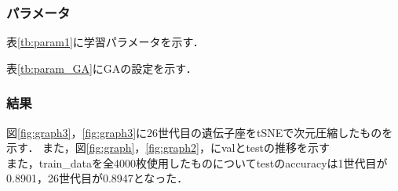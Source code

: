 \documentclass[twocolumn]{jarticle}     %
\begin{document}
\subsubsection{パラメータ}
表\ref{tb:param1}に学習パラメータを示す．
\begin{table}[h]
	\centering
	\caption{学習パラメータ\label{tb:param1}}
\end{table}
表\ref{tb:param_GA}にGAの設定を示す．
\begin{table}[h]
	\centering
	\caption{実験パラメータ\label{tb:param_GA}}
\end{table}
\subsubsection{結果}
図\ref{fig:graph3}，\ref{fig:graph3}に26世代目の遺伝子座をtSNEで次元圧縮したものを示す．
また，図\ref{fig:graph}，\ref{fig:graph2}，にvalとtestの推移を示す\\
また，train\_dataを全4000枚使用したものについてtestのaccuracyは1世代目が0.8901，26世代目が0.8947となった．
\end{document}
